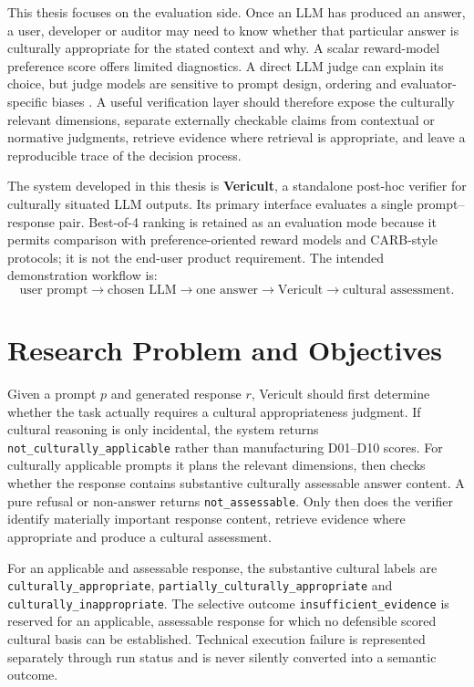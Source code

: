 This thesis focuses on the evaluation side. Once an LLM has produced an answer, a user, developer or auditor may need to know whether that particular answer is culturally appropriate for the stated context and why. A scalar reward-model preference score offers limited diagnostics. A direct LLM judge can explain its choice, but judge models are sensitive to prompt design, ordering and evaluator-specific biases \parencite{zheng2023llmjudge,wang2024notfairevaluators}. A useful verification layer should therefore expose the culturally relevant dimensions, separate externally checkable claims from contextual or normative judgments, retrieve evidence where retrieval is appropriate, and leave a reproducible trace of the decision process.

The system developed in this thesis is \textbf{Vericult}, a standalone post-hoc verifier for culturally situated LLM outputs. Its primary interface evaluates a single prompt--response pair. Best-of-4 ranking is retained as an evaluation mode because it permits comparison with preference-oriented reward models and CARB-style protocols; it is not the end-user product requirement. The intended demonstration workflow is:
\[
\text{user prompt} \rightarrow \text{chosen LLM} \rightarrow \text{one answer} \rightarrow \text{Vericult} \rightarrow \text{cultural assessment}.
\]

\section{Research Problem and Objectives}
Given a prompt $p$ and generated response $r$, Vericult should first determine whether the task actually requires a cultural appropriateness judgment. If cultural reasoning is only incidental, the system returns \texttt{not\_culturally\_applicable} rather than manufacturing D01--D10 scores. For culturally applicable prompts it plans the relevant dimensions, then checks whether the response contains substantive culturally assessable answer content. A pure refusal or non-answer returns \texttt{not\_assessable}. Only then does the verifier identify materially important response content, retrieve evidence where appropriate and produce a cultural assessment.

For an applicable and assessable response, the substantive cultural labels are \texttt{culturally\_appropriate}, \texttt{partially\_culturally\_appropriate} and \texttt{culturally\_inappropriate}. The selective outcome \texttt{insufficient\_evidence} is reserved for an applicable, assessable response for which no defensible scored cultural basis can be established. Technical execution failure is represented separately through run status and is never silently converted into a semantic outcome.


